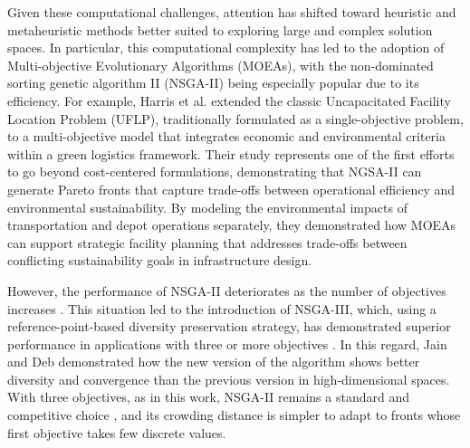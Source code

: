 Given these computational challenges, attention has shifted toward heuristic and metaheuristic methods better suited to exploring large and complex solution spaces. In particular, this computational complexity has led to the adoption of Multi-objective Evolutionary Algorithms (MOEAs), with the non-dominated sorting genetic algorithm II (NSGA-II) being especially popular due to its efficiency. For example, Harris et al. \cite{harris2009multi} extended the classic Uncapacitated Facility Location Problem (UFLP), traditionally formulated as a single-objective problem, to a multi-objective model that integrates economic and environmental criteria within a green logistics framework. Their study represents one of the first efforts to go beyond cost-centered formulations, demonstrating that NGSA-II can generate Pareto fronts that capture trade-offs between operational efficiency and environmental sustainability. By modeling the environmental impacts of transportation and depot operations separately, they demonstrated how MOEAs can support strategic facility planning that addresses trade-offs between conflicting sustainability goals in infrastructure design.

However, the performance of NSGA-II deteriorates as the number of objectives increases \cite{ishibuchi2016performance}. This situation led to the introduction of NSGA-III, which, using a reference-point-based diversity preservation strategy, has demonstrated superior performance in applications with three or more objectives \cite{vargas2025resilient}. In this regard, Jain and Deb \cite{deb2013evolutionary, jain2013evolutionary} demonstrated how the new version of the algorithm shows better diversity and convergence than the previous version in high-dimensional spaces. With three objectives, as in this work, NSGA-II remains a standard and competitive choice \cite{ishibuchi2016performance}, and its crowding distance is simpler to adapt to fronts whose first objective takes few discrete values. 

